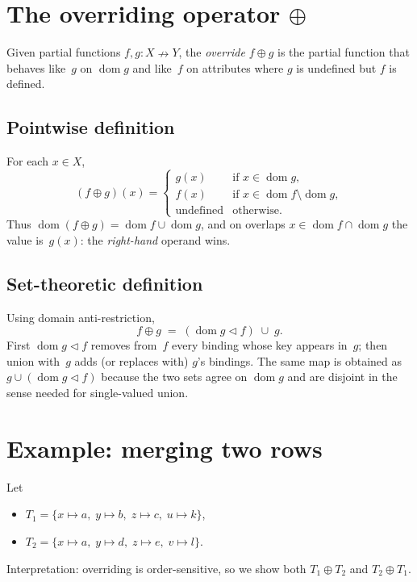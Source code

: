 \documentclass{article}
\newcommand{\dom}{\operatorname{dom}}
\begin{document}
\section{The overriding operator $\oplus$}

Given partial functions $f,g \colon X \nrightarrow Y$, the \emph{override} $f \oplus g$ is the partial function that behaves like~$g$ on $\dom g$ and like~$f$ on attributes where $g$ is undefined but $f$ is defined.

\subsection{Pointwise definition}

For each $x \in X$,
\begin{equation}
\label{eq:pointwise}
(f \oplus g)(x) =
\begin{cases}
  g(x)      & \text{if } x \in \dom g, \\[0.25em]
  f(x)      & \text{if } x \in \dom f \setminus \dom g, \\[0.25em]
  \text{undefined} & \text{otherwise.}
\end{cases}
\end{equation}
Thus $\dom(f \oplus g) = \dom f \cup \dom g$, and on overlaps $x \in \dom f \cap \dom g$ the value is~$g(x)$: the \emph{right-hand} operand wins.

\subsection{Set-theoretic definition}

Using domain anti-restriction,
\begin{equation}
\label{eq:set}
f \oplus g \;=\; (\dom g \vartriangleleft f) \;\cup\; g.
\end{equation}
First $\dom g \vartriangleleft f$ removes from~$f$ every binding whose key appears in~$g$; then union with~$g$ adds (or replaces with) $g$'s bindings. The same map is obtained as $g \cup (\dom g \vartriangleleft f)$ because the two sets agree on $\dom g$ and are disjoint in the sense needed for single-valued union.

\section{Example: merging two rows}

Let
\begin{itemize}
  \item $T_1 = \{ x \mapsto a,\; y \mapsto b,\; z \mapsto c,\; u \mapsto k \}$,
  \item $T_2 = \{ x \mapsto a,\; y \mapsto d,\; z \mapsto e,\; v \mapsto l \}$.
\end{itemize}
Interpretation: overriding is order-sensitive, so we show both $T_1 \oplus T_2$ and $T_2 \oplus T_1$.
\end{document}
